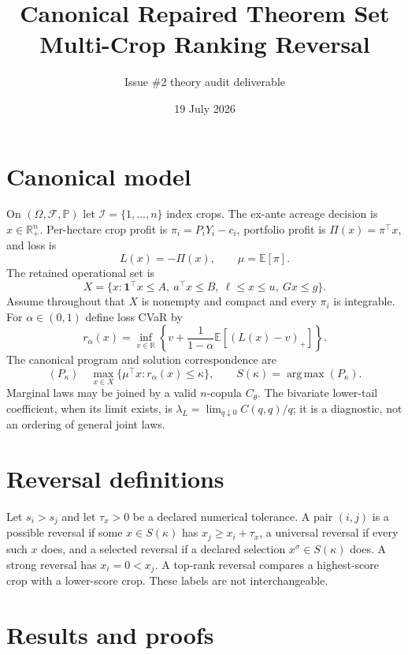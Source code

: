 \documentclass[11pt]{article}
\title{Canonical Repaired Theorem Set\\Multi-Crop Ranking Reversal}
\author{Issue \#2 theory audit deliverable}
\date{19 July 2026}
\theoremstyle{definition}
\newcommand{\argmax}{\operatorname*{arg\,max}}
\begin{document}
\maketitle

\section{Canonical model}

On $(\Omega,\mathcal F,\mathbb P)$ let $\mathcal I=\{1,\ldots,n\}$ index crops.
The ex-ante acreage decision is $x\in\mathbb R_+^n$.  Per-hectare crop
profit is $\pi_i=P_iY_i-c_i$, portfolio profit is
$\Pi(x)=\pi^\top x$, and loss is
\[
L(x)=-\Pi(x),\qquad \mu=\mathbb E[\pi].
\]
The retained operational set is
\[
X=\{x:\mathbf1^\top x\le A,\ a^\top x\le B,\ \ell\le x\le u,\
Gx\le g\}.
\]
Assume throughout that $X$ is nonempty and compact and every $\pi_i$ is
integrable.  For $\alpha\in(0,1)$ define loss CVaR by
\[
r_\alpha(x)=\inf_{v\in\mathbb R}
\left\{v+\frac{1}{1-\alpha}\mathbb E[(L(x)-v)_+]\right\}.
\]
The canonical program and solution correspondence are
\[
(P_\kappa)\quad
\max_{x\in X}\{\mu^\top x:r_\alpha(x)\le\kappa\},\qquad
S(\kappa)=\argmax(P_\kappa).
\]
Marginal laws may be joined by a valid $n$-copula $C_\theta$.
The bivariate lower-tail coefficient, when its limit exists, is
$\lambda_L=\lim_{q\downarrow0}C(q,q)/q$; it is a diagnostic, not an
ordering of general joint laws.

\section{Reversal definitions}

Let $s_i>s_j$ and let $\tau_x>0$ be a declared numerical tolerance.
A pair $(i,j)$ is a possible reversal if some $x\in S(\kappa)$ has
$x_j\ge x_i+\tau_x$, a universal reversal if every such $x$ does, and
a selected reversal if a declared selection $x^\sigma\in S(\kappa)$
does.  A strong reversal has $x_i=0<x_j$.  A top-rank reversal compares
a highest-score crop with a lower-score crop.  These labels are not
interchangeable.

\section{Results and proofs}
\end{document}
